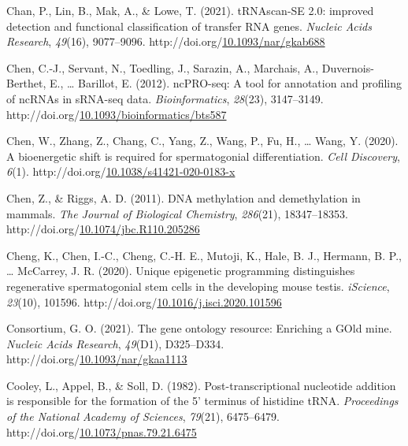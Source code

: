 \documentclass[12pt,twoside]{reedthesis}
\newlength{\cslhangindent}
\newenvironment{CSLReferences}[2] %
 {%
  \setlength{\parindent}{0pt}
  \ifodd #1 \everypar{\setlength{\hangindent}{\cslhangindent}}\ignorespaces\fi
  \ifnum #2 > 0
  \setlength{\parskip}{#2\baselineskip}
  \fi
 }%
 {}
\begin{document}
\begin{CSLReferences}{1}{0}
\leavevmode{}%
Chan, P., Lin, B., Mak, A., \& Lowe, T. (2021). tRNAscan-SE 2.0: improved detection and functional classification of transfer RNA genes. \emph{Nucleic Acids Research}, \emph{49}(16), 9077--9096. http://doi.org/\href{https://doi.org/10.1093/nar/gkab688}{10.1093/nar/gkab688}

\leavevmode{}%
Chen, C.-J., Servant, N., Toedling, J., Sarazin, A., Marchais, A., Duvernois-Berthet, E., \ldots{} Barillot, E. (2012). ncPRO-seq: A tool for annotation and profiling of ncRNAs in sRNA-seq data. \emph{Bioinformatics}, \emph{28}(23), 3147--3149. http://doi.org/\href{https://doi.org/10.1093/bioinformatics/bts587}{10.1093/bioinformatics/bts587}

\leavevmode{}%
Chen, W., Zhang, Z., Chang, C., Yang, Z., Wang, P., Fu, H., \ldots{} Wang, Y. (2020). A bioenergetic shift is required for spermatogonial differentiation. \emph{Cell Discovery}, \emph{6}(1). http://doi.org/\href{https://doi.org/10.1038/s41421-020-0183-x}{10.1038/s41421-020-0183-x}

\leavevmode{}%
Chen, Z., \& Riggs, A. D. (2011). DNA methylation and demethylation in mammals. \emph{The Journal of Biological Chemistry}, \emph{286}(21), 18347--18353. http://doi.org/\href{https://doi.org/10.1074/jbc.R110.205286}{10.1074/jbc.R110.205286}

\leavevmode{}%
Cheng, K., Chen, I.-C., Cheng, C.-H. E., Mutoji, K., Hale, B. J., Hermann, B. P., \ldots{} McCarrey, J. R. (2020). Unique epigenetic programming distinguishes regenerative spermatogonial stem cells in the developing mouse testis. \emph{iScience}, \emph{23}(10), 101596. http://doi.org/\href{https://doi.org/10.1016/j.isci.2020.101596}{10.1016/j.isci.2020.101596}

\leavevmode{}%
Consortium, G. O. (2021). The gene ontology resource: Enriching a GOld mine. \emph{Nucleic Acids Research}, \emph{49}(D1), D325--D334. http://doi.org/\href{https://doi.org/10.1093/nar/gkaa1113}{10.1093/nar/gkaa1113}

\leavevmode{}%
Cooley, L., Appel, B., \& Soll, D. (1982). Post-transcriptional nucleotide addition is responsible for the formation of the 5' terminus of histidine tRNA. \emph{Proceedings of the National Academy of Sciences}, \emph{79}(21), 6475--6479. http://doi.org/\href{https://doi.org/10.1073/pnas.79.21.6475}{10.1073/pnas.79.21.6475}


\end{CSLReferences}
\end{document}
